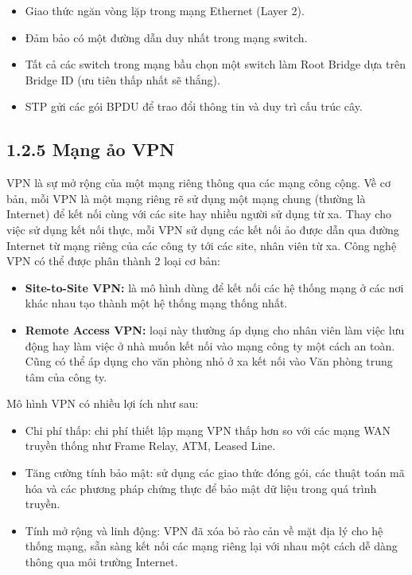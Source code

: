 \begin{itemize}[left=2cm]
    \item Giao thức ngăn vòng lặp trong mạng Ethernet (Layer 2).
    \item Đảm bảo có một đường dẫn duy nhất trong mạng switch.
    \item Tất cả các switch trong mạng bầu chọn một switch làm Root Bridge dựa trên Bridge ID (ưu tiên thấp nhất sẽ thắng).
    \item STP gửi các gói BPDU để trao đổi thông tin và duy trì cấu trúc cây.
\end{itemize}
\subsection*{1.2.5 Mạng ảo VPN}

VPN là sự mở rộng của một mạng riêng thông qua các mạng công cộng. Về cơ bản, mỗi VPN là một mạng riêng rẽ sử dụng một mạng chung (thường là Internet) để kết nối cùng với các site hay nhiều người sử dụng từ xa. Thay cho việc sử dụng kết nối thực, mỗi VPN sử dụng các kết nối ảo được dẫn qua đường Internet từ mạng riêng của các công ty tới các site, nhân viên từ xa. Công nghệ VPN có thể được phân thành 2 loại cơ bản: 
\begin{itemize}[left=2cm]
    \item \textbf{Site-to-Site VPN:} là mô hình dùng để kết nối các hệ thống mạng ở các nơi khác nhau tạo thành một hệ thống mạng thống nhất.
    \item \textbf{Remote Access VPN:} loại này thường áp dụng cho nhân viên làm việc lưu động hay làm việc ở nhà muốn kết nối vào mạng công ty một cách an toàn. Cũng có thể áp dụng cho văn phòng nhỏ ở xa kết nối vào Văn phòng trung tâm của công ty.
\end{itemize}

Mô hình VPN có nhiều lợi ích như sau:

\begin{itemize}[left=2cm]
    \item Chi phí thấp: chi phí thiết lập mạng VPN thấp hơn so với các mạng WAN truyền thống như Frame Relay, ATM, Leased Line.
    \item Tăng cường tính bảo mật: sử dụng các giao thức đóng gói, các thuật toán mã hóa và các phương pháp chứng thực để bảo mật dữ liệu trong quá trình truyền.
    \item Tính mở rộng và linh động: VPN đã xóa bỏ rào cản về mặt địa lý cho hệ thống mạng, sẵn sàng kết nối các mạng riêng lại với nhau một cách dễ dàng thông qua môi trường Internet.
\end{itemize}
